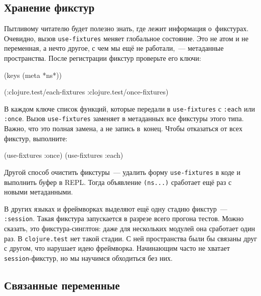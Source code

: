 \subsection{Хранение фикстур}

Пытливому читателю будет полезно знать, где лежит информация о~фикстурах. Очевидно,
вызов \verb|use-fixtures| меняет глобальное состояние. Это не атом и не
переменная, а нечто другое, с чем мы ещё не работали,~--- метаданные
пространства. После регистрации фикстур проверьте его ключи:


\begin{english}
  \begin{clojure}
(keys (meta *ns*))

(:clojure.test/each-fixtures
 :clojure.test/once-fixtures)
  \end{clojure}
\end{english}

В каждом ключе список функций, которые передали в \verb|use-fixtures| с
\verb|:each| или \verb|:once|. Вызов \verb|use-fixtures| заменяет в метаданных
все фикстуры этого типа. Важно, что это полная замена, а не запись
в~конец. Чтобы отказаться от всех фикстур, выполните:

\begin{english}
  \begin{clojure}
(use-fixtures :once)
(use-fixtures :each)
  \end{clojure}
\end{english}

Другой способ очистить фикстуры~--- удалить форму \verb|use-fixtures| в коде и
выполнить буфер в REPL. Тогда объявление \verb|(ns...)|
сработает ещё раз с новыми метаданными.

В других языках и фреймворках выделяют ещё одну стадию фикстур~---
\verb|:session|. Такая фикстура запускается в разрезе всего прогона
тестов. Можно сказать, это фикстура-синглтон: даже для нескольких модулей она
сработает один раз. В \verb|clojure.test| нет такой стадии. С ней пространства
были бы связаны друг с другом, что нарушает идею фреймворка. Начинающим часто не
хватает \verb|session|-фикстур, но мы научимся обходиться без них.

\subsection{Связанные переменные}

